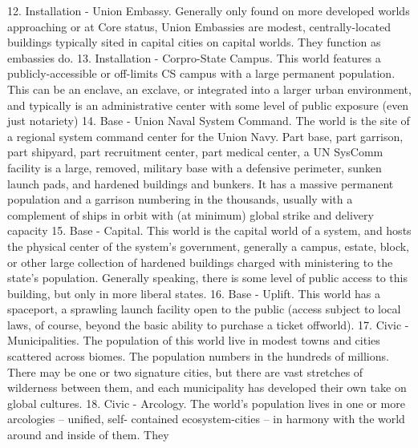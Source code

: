                                                                                                           


     12. Installation - Union Embassy. Generally only found on more developed worlds  
         approaching or at Core status, Union Embassies are modest, centrally-located buildings  
         typically sited in capital cities on capital worlds. They function as embassies do.   
     13. Installation - Corpro-State Campus. This world features a publicly-accessible or off-limits  
         CS campus with a large permanent population. This can be an enclave, an exclave, or  
         integrated into a larger urban environment, and typically is an administrative center with  
         some level of public exposure (even just notariety)   
     14. Base - Union Naval System Command. The world is the site of a regional system  
         command center for the Union Navy. Part base, part garrison, part shipyard, part  
         recruitment center, part medical center, a UN SysComm facility is a large, removed,  
         military base with a defensive perimeter, sunken launch pads, and hardened buildings and  
         bunkers. It has a massive permanent population and a garrison numbering in the  
         thousands, usually with a complement of ships in orbit with (at minimum) global strike and  
         delivery capacity  
     15. Base - Capital. This world is the capital world of a system, and hosts the physical center of  
         the system’s government, generally a campus, estate, block, or other large collection of  
         hardened buildings charged with ministering to the state’s population. Generally speaking,  
         there is some level of public access to this building, but only in more liberal states.   
     16. Base - Uplift. This world has a spaceport, a sprawling launch facility open to the public  
         (access subject to local laws, of course, beyond the basic ability to purchase a ticket  
         offworld).    
     17. Civic - Municipalities. The population of this world live in modest towns and cities scattered  
         across biomes. The population numbers in the hundreds of millions. There may be one or  
         two signature cities, but there are vast stretches of wilderness between them, and each  
         municipality has developed their own take on global cultures.    
     18. Civic - Arcology. The world’s population lives in one or more arcologies -- unified, self- 
         contained ecosystem-cities -- in harmony with the world around and inside of them. They  
